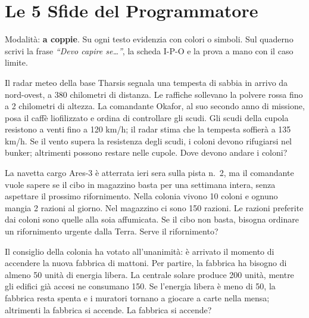 \newpage
\section{Le 5 Sfide del Programmatore}

Modalità: \textbf{a coppie}. Su ogni testo evidenzia con colori o simboli. Sul quaderno scrivi la frase \emph{``Devo capire se\dots''}, la scheda I-P-O e la prova a mano con il caso limite.

\begin{esercizio}
Il radar meteo della base Tharsis segnala una tempesta di sabbia in arrivo da nord-ovest, a 380 chilometri di distanza. Le raffiche sollevano la polvere rossa fino a 2 chilometri di altezza. La comandante Okafor, al suo secondo anno di missione, posa il caffè liofilizzato e ordina di controllare gli scudi. Gli scudi della cupola resistono a venti fino a 120 km/h; il radar stima che la tempesta soffierà a 135 km/h. Se il vento supera la resistenza degli scudi, i coloni devono rifugiarsi nel bunker; altrimenti possono restare nelle cupole. Dove devono andare i coloni?
\end{esercizio}

\begin{esercizio}
La navetta cargo Ares-3 è atterrata ieri sera sulla pista n.~2, ma il comandante vuole sapere se il cibo in magazzino basta per una settimana intera, senza aspettare il prossimo rifornimento. Nella colonia vivono 10 coloni e ognuno mangia 2 razioni al giorno. Nel magazzino ci sono 150 razioni. Le razioni preferite dai coloni sono quelle alla soia affumicata. Se il cibo non basta, bisogna ordinare un rifornimento urgente dalla Terra. Serve il rifornimento?
\end{esercizio}

\begin{esercizio}
Il consiglio della colonia ha votato all'unanimità: è arrivato il momento di accendere la nuova fabbrica di mattoni. Per partire, la fabbrica ha bisogno di almeno 50 unità di energia libera. La centrale solare produce 200 unità, mentre gli edifici già accesi ne consumano 150. Se l'energia libera è meno di 50, la fabbrica resta spenta e i muratori tornano a giocare a carte nella mensa; altrimenti la fabbrica si accende. La fabbrica si accende?
\end{esercizio}

